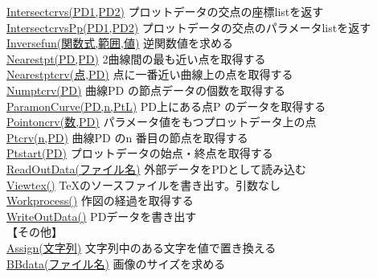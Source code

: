\documentclass[papersize,a4paper,12pt,uplatex]{jsarticle}
\begin{document}
\begin{tabbing}
\hyperlink{intersectcrvs}{Intersectcrvs(PD1,PD2)}    \>プロットデータの交点の座標listを返す\\
\hyperlink{intersectcrvspp}{IntersectcrvsPp(PD1,PD2)}    \>プロットデータの交点のパラメータlistを返す\\
\hyperlink{inversefun}{Inversefun(関数式,範囲,値)}  \>逆関数値を求める\\
\hyperlink{nearestpt}{Nearestpt(PD,PD)}  \>2曲線間の最も近い点を取得する\\
\hyperlink{nearestptcrv}{Nearestptcrv(点,PD)}  \>点に一番近い曲線上の点を取得する\\
\hyperlink{numptcrv}{Numptcrv(PD)}    \>曲線PD の節点データの個数を取得する\\
\hyperlink{paramoncrv}{ParamonCurve(PD,n,PtL)}  \>PD上にある点P のデータを取得する\\
\hyperlink{pointoncrv}{Pointoncrv(数,PD)}  \>パラメータ値をもつプロットデータ上の点\\
\hyperlink{ptcrv}{Ptcrv(n,PD)}  \>曲線PD のn 番目の節点を取得する\\
\hyperlink{ptstart}{Ptstart(PD)}      \>プロットデータの始点・終点を取得する\\
\hyperlink{readoutdata}{ReadOutData(ファイル名)}  \>外部データをPDとして読み込む\\
\hyperlink{viewtex}{Viewtex()}  \>\TeX のソースファイルを書き出す。引数なし\\
\hyperlink{workprocess}{Workprocess()}  \>作図の経過を取得する\\
\hyperlink{writeoutdata}{WriteOutData()}  \>PDデータを書き出す\\
\vspace{\baselineskip}
【その他】\\
\hyperlink{assign}{Assign(文字列)}    \>文字列中のある文字を値で置き換える\\
\hyperlink{bbdata}{BBdata(ファイル名)}    \>画像のサイズを求める\\

\end{tabbing}
\end{document}
